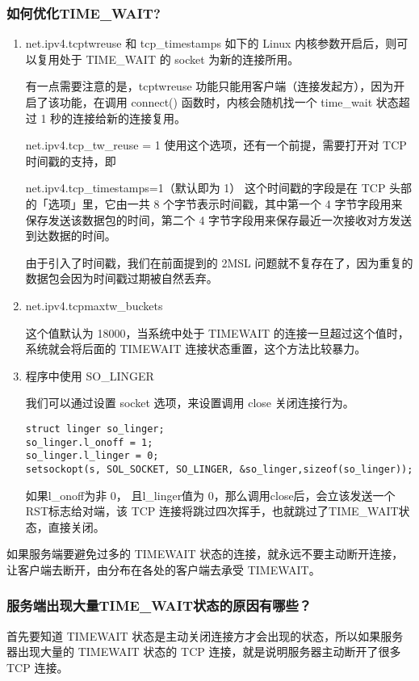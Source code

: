 \documentclass[11pt]{article}
\begin{document}
\subsubsection{如何优化TIME\_WAIT?}
\label{sec:orgb5bf043}
\begin{enumerate}
\item net.ipv4.tcptwreuse 和 tcp\_timestamps
如下的 Linux 内核参数开启后，则可以复用处于 TIME\_WAIT 的 socket 为新的连接所用。

有一点需要注意的是，tcptwreuse 功能只能用客户端（连接发起方），因为开启了该功能，在调用 connect() 函数时，内核会随机找一个 time\_wait 状态超过 1 秒的连接给新的连接复用。

net.ipv4.tcp\_tw\_reuse = 1
使用这个选项，还有一个前提，需要打开对 TCP 时间戳的支持，即

net.ipv4.tcp\_timestamps=1（默认即为 1）
这个时间戳的字段是在 TCP 头部的「选项」里，它由一共 8 个字节表示时间戳，其中第一个 4 字节字段用来保存发送该数据包的时间，第二个 4 字节字段用来保存最近一次接收对方发送到达数据的时间。

由于引入了时间戳，我们在前面提到的 2MSL 问题就不复存在了，因为重复的数据包会因为时间戳过期被自然丢弃。

\item net.ipv4.tcpmaxtw\_buckets

这个值默认为 18000，当系统中处于 TIMEWAIT 的连接一旦超过这个值时，系统就会将后面的 TIMEWAIT 连接状态重置，这个方法比较暴力。

\item 程序中使用 SO\_LINGER

我们可以通过设置 socket 选项，来设置调用 close 关闭连接行为。
\begin{verbatim}
struct linger so_linger;
so_linger.l_onoff = 1;
so_linger.l_linger = 0;
setsockopt(s, SOL_SOCKET, SO_LINGER, &so_linger,sizeof(so_linger));
\end{verbatim}
如果l\_onoff为非 0， 且l\_linger值为 0，那么调用close后，会立该发送一个RST标志给对端，该 TCP 连接将跳过四次挥手，也就跳过了TIME\_WAIT状态，直接关闭。
\end{enumerate}


如果服务端要避免过多的 TIMEWAIT 状态的连接，就永远不要主动断开连接，让客户端去断开，由分布在各处的客户端去承受 TIMEWAIT。
\subsubsection{服务端出现大量TIME\_WAIT状态的原因有哪些？}
\label{sec:orgd19f9a9}
首先要知道 TIMEWAIT 状态是主动关闭连接方才会出现的状态，所以如果服务器出现大量的 TIMEWAIT 状态的 TCP 连接，就是说明服务器主动断开了很多 TCP 连接。
\end{document}
